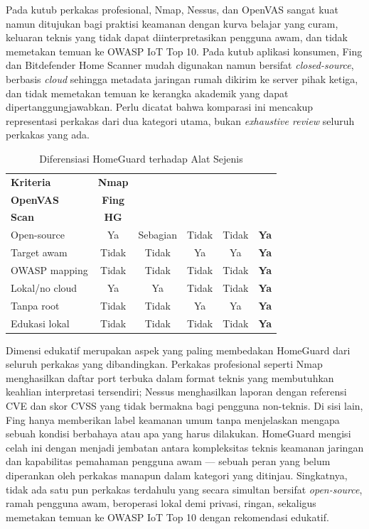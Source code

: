 \documentclass[conference]{IEEEtran}
\begin{document}
Pada kutub perkakas profesional, Nmap, Nessus, dan OpenVAS sangat kuat
namun ditujukan bagi praktisi keamanan dengan kurva belajar yang curam,
keluaran teknis yang tidak dapat diinterpretasikan pengguna awam, dan
tidak memetakan temuan ke OWASP IoT Top 10. Pada kutub aplikasi
konsumen, Fing dan Bitdefender Home Scanner mudah digunakan namun
bersifat \textit{closed-source}, berbasis \textit{cloud} sehingga metadata
jaringan rumah dikirim ke server pihak ketiga, dan tidak memetakan
temuan ke kerangka akademik yang dapat dipertanggungjawabkan. Perlu
dicatat bahwa komparasi ini mencakup representasi perkakas dari dua
kategori utama, bukan \textit{exhaustive review} seluruh perkakas yang ada.

\begin{table}[htbp]
\caption{Diferensiasi HomeGuard terhadap Alat Sejenis}
\label{tab:diferensiasi}
\renewcommand{\arraystretch}{1.2}
\begin{tabular}{|l|c|c|c|c|c|}
\hline
\textbf{Kriteria} & \textbf{Nmap} & \makecell{\textbf{Nessus/}\\\textbf{OpenVAS}} & \textbf{Fing} & \makecell{\textbf{Bitdef.}\\\textbf{Scan}} & \textbf{HG} \\
\hline
Open-source    & Ya  & Sebagian & Tidak & Tidak & \textbf{Ya} \\
\hline
Target awam    & Tidak & Tidak  & Ya    & Ya    & \textbf{Ya} \\
\hline
OWASP mapping  & Tidak & Tidak  & Tidak & Tidak & \textbf{Ya} \\
\hline
Lokal/no cloud & Ya  & Ya     & Tidak & Tidak & \textbf{Ya} \\
\hline
Tanpa root     & Tidak & Tidak  & Ya    & Ya    & \textbf{Ya} \\
\hline
Edukasi lokal  & Tidak & Tidak  & Tidak & Tidak & \textbf{Ya} \\
\hline
\end{tabular}
\end{table}

Dimensi edukatif merupakan aspek yang paling membedakan HomeGuard
dari seluruh perkakas yang dibandingkan. Perkakas profesional seperti
Nmap menghasilkan daftar port terbuka dalam format teknis yang
membutuhkan keahlian interpretasi tersendiri; Nessus menghasilkan
laporan dengan referensi CVE dan skor CVSS yang tidak bermakna bagi
pengguna non-teknis. Di sisi lain, Fing hanya memberikan label keamanan
umum tanpa menjelaskan mengapa sebuah kondisi berbahaya atau apa yang
harus dilakukan. HomeGuard mengisi celah ini dengan menjadi jembatan
antara kompleksitas teknis keamanan jaringan dan kapabilitas pemahaman
pengguna awam --- sebuah peran yang belum diperankan oleh perkakas
manapun dalam kategori yang ditinjau. Singkatnya, tidak ada satu pun
perkakas terdahulu yang secara simultan bersifat \textit{open-source},
ramah pengguna awam, beroperasi lokal demi privasi, ringan, sekaligus
memetakan temuan ke OWASP IoT Top 10 dengan rekomendasi edukatif.
\end{document}
